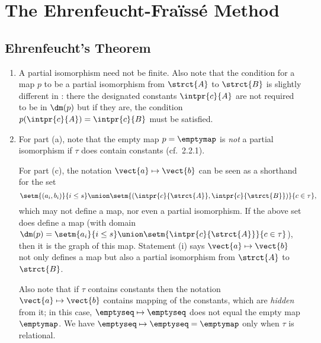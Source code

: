 \setcounter{chapter}{1}
\chapter{The Ehrenfeucht-Fra\"{i}ss\'{e} Method}
\setcounter{section}{1}
\section{Ehrenfeucht's Theorem}
\begin{enumerate}[1.]
%
\item {} A partial isomorphism need not be finite.
\newpar
Also note that the condition for a map $p$ to be a partial isomorphism from $\strct{A}$ to $\strct{B}$ is slightly different in \cite{EFT}: there the designated constants $\intpr{c}{A}$ are not required to be in $\dm(p)$ but if they are, the condition $p(\intpr{c}{A}) = \intpr{c}{B}$ must be satisfied.
%
\item {} For part (a), note that the empty map $p = \emptymap$ is \emph{not} a partial isomorphism if $\tau$ does contain constants (cf.\ 2.2.1).

For part (c), the notation $\vect{a} \mapsto \vect{b}$ can be seen as a shorthand for the set
\[
\setm{(a_i, b_i)}{i \leq s} \union \setm{(\intpr{c}{\strct{A}}, \intpr{c}{\strct{B}})}{c \in \tau},
\]
which may not define a map, nor even a partial isomorphism. If the above set does define a map (with domain $\dm(p) = \setm{a_i}{i \leq s} \union \setm{\intpr{c}{\strct{A}}}{c \in \tau}$), then it is the graph of this map. Statement (i) says $\vect{a} \mapsto \vect{b}$ not only defines a map but also a partial isomorphism from $\strct{A}$ to $\strct{B}$.

Also note that if $\tau$ contains constants then the notation $\vect{a} \mapsto \vect{b}$ contains mapping of the constants, which are \emph{hidden} from it; in this case, $\emptyseq \mapsto \emptyseq$ does not equal the empty map $\emptymap$. We have $\emptyseq \mapsto \emptyseq = \emptymap$ only when $\tau$ is relational.


\end{enumerate}
